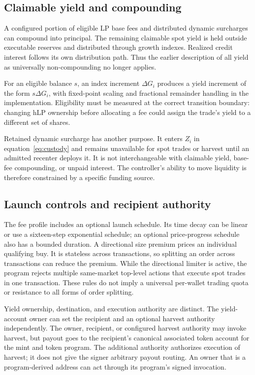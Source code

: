 \subsection{Claimable yield and compounding}

A configured portion of eligible LP base fees and distributed dynamic surcharges can compound into principal. The remaining claimable spot yield is held outside executable reserves and distributed through growth indexes. Realized credit interest follows its own distribution path. Thus the earlier description of all yield as universally non-compounding no longer applies.

For an eligible balance $s$, an index increment $\Delta G_i$ produces a yield increment of the form $s\Delta G_i$, with fixed-point scaling and fractional remainder handling in the implementation. Eligibility must be measured at the correct transition boundary: changing hLP ownership before allocating a fee could assign the trade's yield to a different set of shares.

Retained dynamic surcharge has another purpose. It enters $Z_i$ in equation~\eqref{eq:custody} and remains unavailable for spot trades or harvest until an admitted recenter deploys it. It is not interchangeable with claimable yield, base-fee compounding, or unpaid interest. The controller's ability to move liquidity is therefore constrained by a specific funding source.

\ifexpanded
\subsection{Launch controls and recipient authority}

The fee profile includes an optional launch schedule. Its time decay can be linear or use a sixteen-step exponential schedule; an optional price-progress schedule also has a bounded duration. A directional size premium prices an individual qualifying buy. It is stateless across transactions, so splitting an order across transactions can reduce the premium. While the directional limiter is active, the program rejects multiple same-market top-level actions that execute spot trades in one transaction. These rules do not imply a universal per-wallet trading quota or resistance to all forms of order splitting.

Yield ownership, destination, and execution authority are distinct. The yield-account owner can set the recipient and an optional harvest authority independently. The owner, recipient, or configured harvest authority may invoke harvest, but payout goes to the recipient's canonical associated token account for the mint and token program. The additional authority authorizes execution of harvest; it does not give the signer arbitrary payout routing. An owner that is a program-derived address can act through its program's signed invocation.

